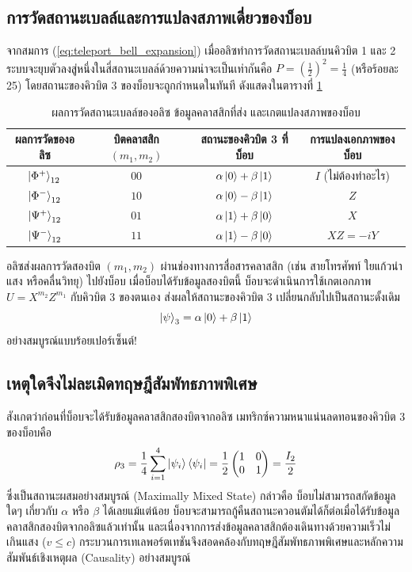 \subsection{การวัดสถานะเบลล์และการแปลงสภาพเดี่ยวของบ็อบ}
จากสมการ (\ref{eq:teleport_bell_expansion}) เมื่ออลิซทำการวัดสถานะเบลล์บนคิวบิต 1 และ 2 ระบบจะยุบตัวลงสู่หนึ่งในสี่สถานะเบลล์ด้วยความน่าจะเป็นเท่ากันคือ $P = \left(\frac{1}{2}\right)^2 = \frac{1}{4}$ (หรือร้อยละ 25) โดยสถานะของคิวบิต 3 ของบ็อบจะถูกกำหนดในทันที ดังแสดงในตารางที่ \ref{tab:teleport_correction_table}

\begin{table}[H]
\centering
\caption{ผลการวัดสถานะเบลล์ของอลิซ ข้อมูลคลาสสิกที่ส่ง และเกตแปลงสภาพของบ็อบ}
\label{tab:teleport_correction_table}
\begin{tabular}{cccc}
\toprule
\textbf{ผลการวัดของอลิซ} & \textbf{บิตคลาสสิก $(m_1, m_2)$} & \textbf{สถานะของคิวบิต 3 ที่บ็อบ} & \textbf{การแปลงเอกภาพของบ็อบ} \\
\midrule
$\ket{\Phi^+}_{12}$ & $00$ & $\alpha\ket{0} + \beta\ket{1}$ & $I$ (ไม่ต้องทำอะไร) \\
$\ket{\Phi^-}_{12}$ & $10$ & $\alpha\ket{0} - \beta\ket{1}$ & $Z$ \\
$\ket{\Psi^+}_{12}$ & $01$ & $\alpha\ket{1} + \beta\ket{0}$ & $X$ \\
$\ket{\Psi^-}_{12}$ & $11$ & $\alpha\ket{1} - \beta\ket{0}$ & $XZ = -iY$ \\
\bottomrule
\end{tabular}
\end{table}

อลิซส่งผลการวัดสองบิต $(m_1, m_2)$ ผ่านช่องทางการสื่อสารคลาสสิก (เช่น สายโทรศัพท์ ใยแก้วนำแสง หรือคลื่นวิทยุ) ไปยังบ็อบ เมื่อบ็อบได้รับข้อมูลสองบิตนี้ บ็อบจะดำเนินการใช้เกตเอกภาพ $U = X^{m_2} Z^{m_1}$ กับคิวบิต 3 ของตนเอง ส่งผลให้สถานะของคิวบิต 3 เปลี่ยนกลับไปเป็นสถานะดั้งเดิม
\begin{equation}
\ket{\psi}_3 = \alpha\ket{0} + \beta\ket{1}
\end{equation}
อย่างสมบูรณ์แบบร้อยเปอร์เซ็นต์!

\subsection{เหตุใดจึงไม่ละเมิดทฤษฎีสัมพัทธภาพพิเศษ}
สังเกตว่าก่อนที่บ็อบจะได้รับข้อมูลคลาสสิกสองบิตจากอลิซ เมทริกซ์ความหนาแน่นลดทอนของคิวบิต 3 ของบ็อบคือ
\begin{equation}
\rho_3 = \frac{1}{4} \sum_{i=1}^4 \ket{\psi_i}\bra{\psi_i} = \frac{1}{2} \begin{pmatrix} 1 & 0 \\ 0 & 1 \end{pmatrix} = \frac{I_2}{2}
\end{equation}
ซึ่งเป็นสถานะผสมอย่างสมบูรณ์ (Maximally Mixed State) กล่าวคือ บ็อบไม่สามารถสกัดข้อมูลใดๆ เกี่ยวกับ $\alpha$ หรือ $\beta$ ได้เลยแม้แต่น้อย บ็อบจะสามารถกู้คืนสถานะควอนตัมได้ก็ต่อเมื่อได้รับข้อมูลคลาสสิกสองบิตจากอลิซแล้วเท่านั้น และเนื่องจากการส่งข้อมูลคลาสสิกต้องเดินทางด้วยความเร็วไม่เกินแสง ($v \le c$) กระบวนการเทเลพอร์ตเทชันจึงสอดคล้องกับทฤษฎีสัมพัทธภาพพิเศษและหลักความสัมพันธ์เชิงเหตุผล (Causality) อย่างสมบูรณ์

